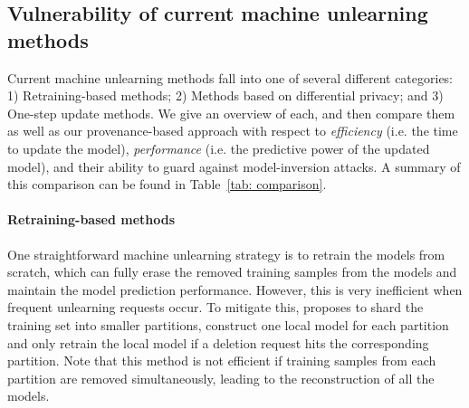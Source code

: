 \documentclass[11pt]{article}
\begin{document}

\subsection{Vulnerability of current machine unlearning methods}
\label{sec: model_inversion_attack_for_sota}


Current machine unlearning methods fall into one of several different categories:  1) Retraining-based methods; 2) Methods based on differential privacy; and 3) One-step update methods.
We give an overview of each, and then compare them as well as our provenance-based approach with respect to {\em efficiency} (i.e. the time to update the model), {\em performance} (i.e. the predictive power of the updated model), and their ability to guard against model-inversion attacks.  A summary of this comparison can be found in Table~\ref{tab: comparison}.

\paragraph{Retraining-based methods} One straightforward machine unlearning strategy is to retrain the models from scratch, which can fully erase the removed training samples from the models and maintain the model prediction performance. However, this is very inefficient when frequent unlearning requests occur. To mitigate this, \cite{bourtoule2021machine} proposes to shard the training set into smaller partitions, construct one local model for each partition and only retrain the local model if a deletion request hits the corresponding partition. Note that this method is not efficient if training samples from each partition are removed simultaneously, leading to the reconstruction of all the models.
\end{document}
